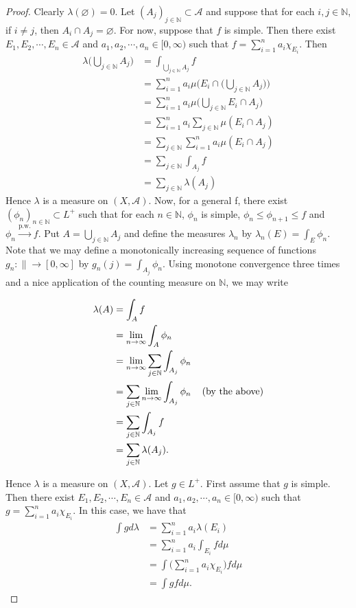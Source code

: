 \documentclass{book}
\theoremstyle{definition}
\newcommand{\lam}{\lambda}
\newcommand{\N}{\mathbb{N}}
\newcommand{\MA}{\mathcal{A}}
\DeclareMathOperator*{\0}{\mbf{0}}
\DeclareMathOperator*{\1}{\mbf{1}}
\newcommand{\limn}{\lim \limits_{n \rightarrow \infty}}
\newcommand{\RG}{[0,\infty]}
\newcommand{\Rg}{[0,\infty)}
\begin{document}
	\begin{proof}
		Clearly $\lam(\varnothing) = 0$. Let $(A_j)_{j \in \N} \subset \MA$ and suppose that for each $i, j \in \N$, if $i \neq j$, then $A_i \cap A_j = \varnothing$. For now, suppose that $f$ is simple. Then there exist $E_1, E_2, \cdots, E_n \in \MA$ and  $a_1, a_2, \cdots, a_n \in \Rg$ such that $f = \sum\limits_{i=1}^n a_i \chi_{E_i}$.  Then 
		\begin{align*}
			\lam\bigg(\bigcup_{j \in \N} A_j\bigg) 
			&= \int_{\bigcup_{j \in \N} A_j} f\\
			&= \sum_{i = 1} ^n a_i\mu\bigg(E_i \cap \bigg(\bigcup_{j \in \N} A_j\bigg)\bigg)\\
			&= \sum_{i = 1} ^n a_i\mu\bigg(\bigcup_{j \in \N} E_i \cap A_j\bigg)\\
			&= \sum_{i = 1} ^n a_i \sum_{j \in \N} \mu(E_i \cap A_j)\\
			&= \sum_{j \in \N} \sum_{i = 1} ^n a_i \mu(E_i \cap A_j)\\
			&= \sum_{j \in \N} \int_{A_j} f\\
			&= \sum_{j \in \N} \lam(A_j)
		\end{align*} 
		Hence $\lam$ is a measure on $(X, \MA)$. Now, for a general f, there exist $(\phi_n)_{n \in \N} \subset L^+$ such that for each $n \in \N$, $\phi_n$ is simple, $\phi_n \leq \phi_{n+1} \leq f$ and $\phi_n \xrightarrow{\text{p.w.}} f$. Put $A = \bigcup_{j \in \N}A_j$ and define the measures $\lam_n$ by $\lam_n(E) = \int_E \phi_n$. Note that we may define a monotonically increasing sequence of functions $g_n: \|\rightarrow \RG$ by $g_n(j) = \int_{A_j} \phi_n$. Using monotone convergence three times and a nice application of the counting measure on $\N$, we may write
		
		\begin{align*}
			\lam(A) 
			&= \int_A f\\
			&= \limn \int_A \phi_n\\
			&= \limn \sum_{j \in \N} \int_{A_j} \phi_n\\
			&= \sum_{j \in \N} \limn \int_{A_j} \phi_n \hspace{4mm} \text{(by the above)}\\
			&= \sum_{j \in \N} \int_{A_j} f\\
			&= \sum_{j \in \N} \lam(A_j).
		\end{align*} 
		
		Hence $\lam$ is a measure on $(X, \MA)$. Let $g \in L^+$. First assume that $g$ is simple. Then there exist $E_1, E_2, \cdots, E_n \in \MA$ and  $a_1, a_2, \cdots, a_n \in \Rg$ such that $g = \sum\limits_{i=1}^n a_i \chi_{E_i}$.
		In this case, we have that 
		\begin{align*}
			\int g d\lam 
			&= \sum_{i=1}^n a_i \lam(E_i)\\
			&= \sum_{i=1}^n a_i \int_{E_i} f d\mu\\
			&= \int \bigg(\sum_{i=1}^n a_i\chi_{E_i} \bigg) f d\mu\\
			&= \int gf d\mu.
		\end{align*}
		

\end{proof}
\end{document}
